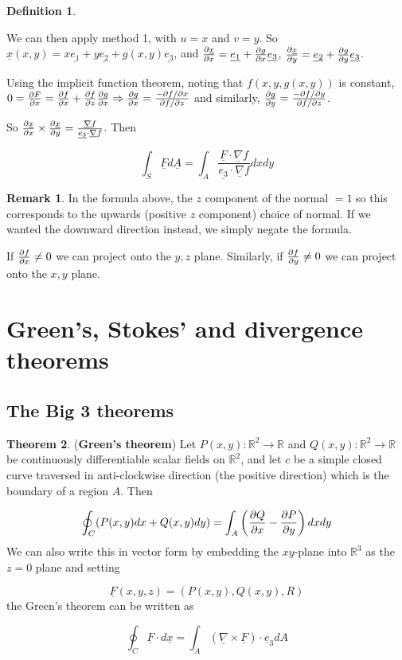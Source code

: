 \documentclass[12pt,a4paper]{article}
\theoremstyle{definition}
\newtheorem{definition}{Definition}[subsection]
\newtheorem{theorem}[definition]{Theorem}
\newtheorem*{remark}{Remark}
\begin{document}
\begin{definition}
\begin{enumerate}
		We can then apply method 1, with $u = x$ and $v = y$. So $\underline{x}(x, y) = x \underline{e_1} + y \underline{e_2} + g(x, y) \underline{e_3}$, and $\diffp{\underline{x}}{x} = \underline{e_1} + \diffp{g}{x} \underline{e_3}$, $\diffp{\underline{x}}{y} = \underline{e_2} + \diffp{g}{y} \underline{e_3}$.

		Using the implicit function theorem, noting that $f(x, y, g(x, y))$ is constant, $0 = \diffp{F}{x} = \diffp{f}{x} + \diffp{f}{z} \diffp{g}{x} \Rightarrow \diffp{g}{x} = \frac{-\partial f / \partial x}{\partial f / \partial z}$ and similarly, $\diffp{g}{y} = \frac{-\partial f / \partial y}{\partial f / \partial z}$.

		So $\diffp{\underline{x}}{x} \times \diffp{\underline{x}}{y} = \frac{\underline{\nabla}f}{\underline{e_3} \cdot \underline{\nabla}f}$. Then

		\[ \int_S \underline{F} d\underline{A} = \int_A \frac{\underline{F} \cdot \underline{\nabla}f}{\underline{e_3} \cdot \underline{\nabla}f} dx dy \]
	\end{enumerate}
\end{definition}

\begin{remark}
	In the formula above, the $z$ component of the normal $= 1$ so this corresponds to the upwards (positive $z$ component) choice of normal. If we wanted the downward direction instead, we simply negate the formula.

	If $\diffp{f}{x} \ne 0$ we can project onto the $y, z$ plane. Similarly, if $\diffp{f}{y} \ne 0$ we can project onto the $x, y$ plane.
\end{remark}

\section{Green's, Stokes' and divergence theorems}

\subsection{The Big 3 theorems}

\begin{theorem}
	(\textbf{Green's theorem}) Let $P(x, y): \mathbb{R}^2 \rightarrow \mathbb{R}$ and $Q(x, y): \mathbb{R}^2 \rightarrow \mathbb{R}$ be continuously differentiable scalar fields on $\mathbb{R}^2$, and let $c$ be a simple closed curve traversed in anti-clockwise direction (the positive direction) which is the boundary of a region $A$. Then
	
	\[\oint_C (P(x, y) dx + Q(x, y) dy) = \int_A \left( \diffp{Q}{x} - \diffp{P}{y} \right) dx dy \]
	We can also write this in vector form by embedding the $xy$-plane into $\mathbb{R}^3$ as the $z = 0$ plane and setting

	\[ \underline{F}(x, y, z) = (P(x, y), Q(x, y), R) \]
	the Green's theorem can be written as

	\[ \oint_C \underline{F} \cdot d\underline{x} = \int_A \left( \underline{\nabla} \times \underline{F} \right) \cdot \underline{e}_3 dA \]
\end{theorem}
\end{document}
